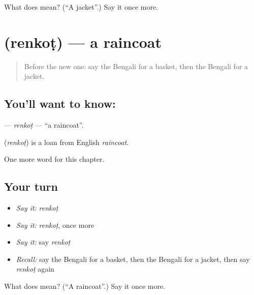 \begin{tcolorbox}[breakable,colback=teal!4,colframe=teal!35!black,title={Before you move on}]
What does  mean? (\textquotedblleft{}A jacket\textquotedblright{}.) Say it once more.
\end{tcolorbox}
\section[\texorpdfstring{\bn{রেনকোট} (renkoṭ)}{রেনকোট (renkoṭ)}]{ (renkoṭ) — a raincoat}

\label{lesson:BN-C195-renkot}



\begin{quote}
Before the new one: say the Bengali for a basket, then the Bengali for a jacket.
\end{quote}

\subsection*{You'll want to know: }
\textbf{} — \emph{renkoṭ} — \textquotedblleft{}a raincoat\textquotedblright{}.

\begin{cousinweb}
\textbf{} (\emph{renkoṭ}) is a loan from English \emph{raincoat}.
\end{cousinweb}

\begin{grammarlens}[title={What you've built}]
One more word for this chapter.
\end{grammarlens}

\subsection*{Your turn}
\begin{itemize}
\raggedright
  \item \emph{Say it:} \emph{renkoṭ}
  \item \emph{Say it:} \emph{renkoṭ}, once more
  \item \emph{Say it:} say \emph{renkoṭ}
  \item \emph{Recall:} say the Bengali for a basket, then the Bengali for a jacket, then say \emph{renkoṭ} again
\end{itemize}

\begin{tcolorbox}[breakable,colback=teal!4,colframe=teal!35!black,title={Before you move on}]
What does  mean? (\textquotedblleft{}A raincoat\textquotedblright{}.) Say it once more.
\end{tcolorbox}
